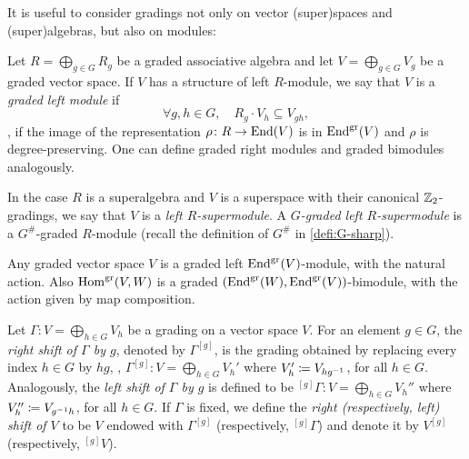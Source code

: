 It is useful to consider gradings not only on vector (super)spaces and (super)algebras, but also on modules:

\begin{defi}\label{defi:grdModule}
    Let $R = \bigoplus_{g\in G} R_g$ be a graded associative algebra and let $V = \bigoplus_{g\in G} V_g$ be a graded vector space. 
    If $V$ has a structure of left $R$-module, we say that $V$ is a \emph{graded left module} if 
    \[
        \forall g,h \in G, \quad R_g \cdot V_h \subseteq V_{gh},
    \]
    \ie, if the image of the representation $\rho\colon R \to \operatorname{End}(V)$ is in $\operatorname{End}^{\textrm{gr}}(V)$ and $\rho$ is degree-preserving. 
    One can define graded right modules and graded bimodules analogously. 
\end{defi}

In the case $R$ is a superalgebra and $V$ is a superspace with their canonical $\mathbb{Z}_2$-gradings, we say that $V$ is a \emph{left $R$-supermodule}. 
A \emph{$G$-graded left $R$-supermodule} is a $G^\#$-graded $R$-module (recall the definition of $G^\#$ in \cref{defi:G-sharp}).

\begin{ex}
    Any graded vector space $V$ is a graded left $\operatorname{End}^{\textrm{gr}}(V)$-module, with the natural action. 
    Also $\operatorname{Hom}^{\textrm{gr}}(V, W)$ is a graded $(\operatorname{End}^{\textrm{gr}}(W),\operatorname{End}^{\textrm{gr}}(V))$-bimodule, with the action given by map composition. 
\end{ex}




\begin{defi}
    Let $\Gamma: V = \bigoplus_{h\in G} V_h$ be a grading on a vector space $V$. 
    For an element $g\in G$, the \emph{right shift of $\Gamma$ by $g$}, denoted by $\Gamma^{[g]}$, is the grading obtained by replacing every index $h \in G$ by $hg$, \ie, $\Gamma^{[g]} : V = \bigoplus_{h\in G} V_h'$ where $V_{h}' \coloneqq V_{h g^{-1}}$, for all $h\in G$. 
    Analogously, the \emph{left shift of $\Gamma$ by $g$} is defined to be ${}^{[g]}\Gamma : V = \bigoplus_{h\in G} V_h''$ where $V_{h}'' \coloneqq V_{g^{-1} h}$, for all $h\in G$. 
    If $\Gamma$ is fixed, we define the \emph{right (respectively, left) shift of $V$} to be $V$ endowed with $\Gamma^{[g]}$ (respectively, ${}^{[g]}\Gamma$) and denote it by $V^{[g]}$ (respectively, ${}^{[g]}V$).
\end{defi}

